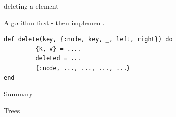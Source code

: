 \begin{frame}[fragile]{deleting a element}

\pause Algorithm first - then implement.

\pause
\begin{verbatim}
def delete(key, {:node, key, _, left, right}) do 
         {k, v} = ....
         deleted = ...
         {:node, ..., ..., ..., ...}
end
\end{verbatim}

\end{frame}



\begin{frame}{Summary}

\vspace{40pt}\hspace{80pt}Trees

\end{frame}






